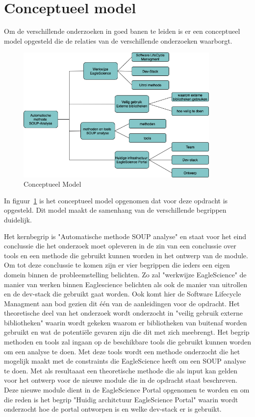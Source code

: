 \section{Conceptueel model}\label{sec:conceptueel-model}
Om de verschillende onderzoeken in goed banen te leiden is er een conceptueel model opgesteld die de relaties van de verschillende onderzoeken waarborgt.
\begin{figure}[H]
    \centering
    \includegraphics[width=10cm]{gfx/Conceptueel Model}
    \caption{Conceptueel Model}
    \label{fig:ConceptueelModel}
\end{figure}

In figuur~\ref{fig:ConceptueelModel} is het conceptueel model opgenomen dat voor deze opdracht is opgesteld. Dit model maakt de samenhang van de verschillende begrippen duidelijk.

Het kernbegrip is "Automatische methode SOUP analyse" en staat voor het eind conclussie die het onderzoek moet opleveren in de zin van een conclussie over tools en een methode die gebruikt kunnen worden in het ontwerp van de module. Om tot deze conclussie te komen zijn er vier begrippen die ieders een eigen domein binnen de probleemstelling belichten. Zo zal "werkwijze EagleScience" de manier van werken binnen Eaglescience belichten als ook de manier van uitrollen en de dev-stack die gebruikt gaat worden. Ook komt hier de Software Lifecycle Managment aan bod gezien dit één van de aanleidingen voor de opdracht. Het theoretische deel van het onderzoek wordt onderzocht in "veilig gebruik externe bibliotheken" waarin wordt gekeken waarom er bibliotheken van buitenaf worden gebruikt en wat de potentiële gevaren zijn die dit met zich meebrengt. Het begrip methoden en tools zal ingaan op de beschikbare tools die gebruikt kunnen worden om een analyse te doen. Met deze tools wordt een methode onderzocht die het mogelijk maakt met de constraints die EagleScience heeft om een SOUP analyse te doen. Met als resultaaat een theoretische methode die als input kan gelden voor het ontwerp voor de nieuwe module die in de opdracht staat beschreven. Deze nieuwe module dient in de EagleScience Portal opgenomen te worden en om die reden is het begrip "Huidig architctuur EagleScience Portal" waarin wordt onderzocht hoe de portal ontworpen is en welke dev-stack er is gebruikt.

